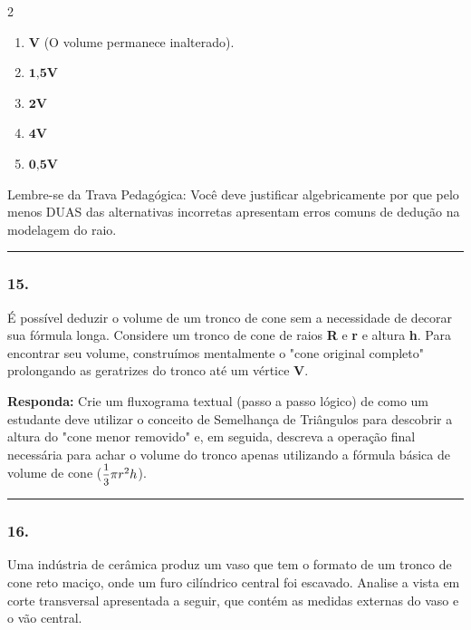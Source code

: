 \documentclass[twoside, 10pt, a4paper]{article}
\newlength{\espacoPreQuestao}\setlength{\espacoPreQuestao}{0.1cm}
\newlength{\espacoQuestao}\setlength{\espacoQuestao}{0.2cm}
\newlength{\espacoAlt}\setlength{\espacoAlt}{0.2cm}
\begin{document}
\begin{multicols*}{2}
\begin{enumerate}[label=\alph*), itemsep=\espacoAlt]
\item $ \textbf{V} $ (O volume permanece inalterado).
\item $ \textbf{1,5V} $
\item $ \textbf{2V} $
\item $ \textbf{4V} $
\item $ \textbf{0,5V} $
\end{enumerate}
\begin{boxdica}
Lembre-se da Trava Pedagógica: Você deve justificar algebricamente por que pelo menos DUAS das alternativas incorretas apresentam erros comuns de dedução na modelagem do raio.
\end{boxdica}
\par\vspace{\espacoQuestao}

\noindent\textcolor{CorLinha}{\rule{\linewidth}{0.5pt}} 
\par\vspace{\espacoPreQuestao}
\subsubsection*{15.} É possível deduzir o volume de um tronco de cone sem a necessidade de decorar sua fórmula longa. Considere um tronco de cone de raios \textbf{R} e \textbf{r} e altura \textbf{h}. Para encontrar seu volume, construímos mentalmente o "cone original completo" prolongando as geratrizes do tronco até um vértice \textbf{V}.
\begin{boxresponda}
\textbf{Responda:} Crie um fluxograma textual (passo a passo lógico) de como um estudante deve utilizar o conceito de Semelhança de Triângulos para descobrir a altura do "cone menor removido" e, em seguida, descreva a operação final necessária para achar o volume do tronco apenas utilizando a fórmula básica de volume de cone ($ \mfrac{1}{3}\pi r^2 h $).
\end{boxresponda}
\par\vspace{\espacoQuestao}

\noindent\textcolor{CorLinha}{\rule{\linewidth}{0.5pt}} 
\par\vspace{\espacoPreQuestao}
\subsubsection*{16.} Uma indústria de cerâmica produz um vaso que tem o formato de um tronco de cone reto maciço, onde um furo cilíndrico central foi escavado. Analise a vista em corte transversal apresentada a seguir, que contém as medidas externas do vaso e o vão central.


\end{multicols*}
\end{document}
